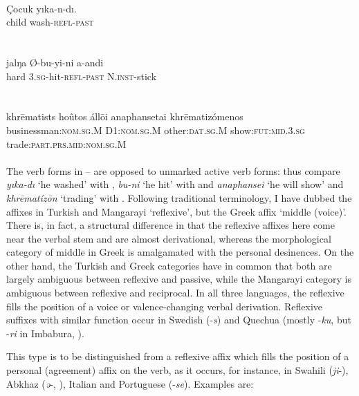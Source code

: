 \ea\label{ex:E16}
\\
\gll Çocuk  yıka-n-dı.\\
 child  wash-\textsc{refl}-\textsc{past}\\
\\
\z
\noindent \ea\label{ex:E17}
 \\
\gll jalŋa  Ø-bu-yi-ni  a-andi\\
hard  3.\textsc{sg}-hit-\textsc{refl}-\textsc{past}  N.\textsc{inst}-stick\\
\\
\z
\noindent \ea\label{ex:E18}
\\
\gll   khr\=ematists  hoûtos áll\=oi  anaphansetai  khr\=ematizómenos\\
 businessman:\textsc{nom}.\textsc{sg}.M  D1:\textsc{nom}.\textsc{sg}.M  other:\textsc{dat}.\textsc{sg}.M show:\textsc{fut}:\textsc{mid}.3.\textsc{sg} trade:\textsc{part}.\textsc{prs}.\textsc{mid}:\textsc{nom}.\textsc{sg}.M\\
\\
\z
\noindent The verb forms in -- are opposed to unmarked active verb forms: thus compare \textit{yıka-dı} ‘he washed’ with , \textit{bu-ni} ‘he hit’ with  and \textit{anaphansei} ‘he will show’ and \textit{khr\=ematíz\=on} ‘trading’ with . Following traditional terminology, I have dubbed the affixes in Turkish and Mangarayi ‘reflexive’, but the Greek affix ‘middle (voice)’. There is, in fact, a structural difference in that the reflexive affixes here come near the verbal stem and are almost derivational, whereas the morphological category of middle in Greek is amalgamated with the personal desinences. On the other hand, the Turkish and Greek categories have in common that both are largely ambiguous between reflexive and passive, while the Mangarayi category is ambiguous between reflexive and reciprocal. In all three languages, the reflexive fills the position of a voice or valence-changing verbal derivation. Reflexive suffixes with similar function occur in Swedish (-\textit{s}) and Quechua (mostly -\textit{ku}, but -\textit{ri} in Imbabura, \citealt[90f]{Cole1982}).

This type is to be distinguished from a reflexive affix which fills the position of a personal (agreement) affix on the verb, as it occurs, for instance, in Swahili (\textit{ji}{}-), Abkhaz (\textit{ə}{}-, \citealt[77]{Hewitt1979}), Italian and Portuguese (-\textit{se}). Examples are:

